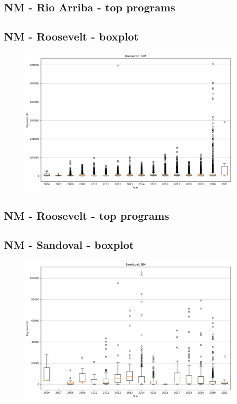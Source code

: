\subsection*{NM - Rio Arriba - top programs}

\newpage
\subsection*{NM - Roosevelt - boxplot}
\begin{figure}[h]
\centering
\includegraphics[width=7in]{../output/boxplots/counties/Roosevelt-NM_boxplot.png}
\end{figure}


\subsection*{NM - Roosevelt - top programs}

\newpage
\subsection*{NM - Sandoval - boxplot}
\begin{figure}[h]
\centering
\includegraphics[width=7in]{../output/boxplots/counties/Sandoval-NM_boxplot.png}
\end{figure}


